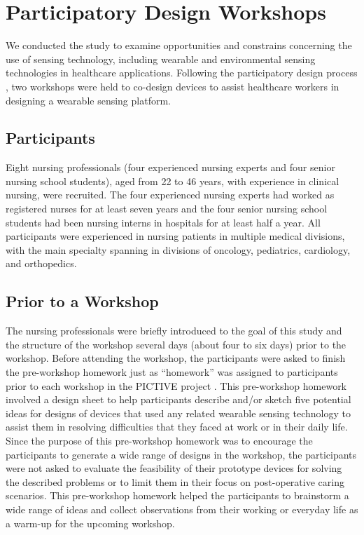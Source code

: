 \section{Participatory Design Workshops}
We conducted the study to examine opportunities and constrains concerning the use of sensing technology, including wearable and environmental sensing technologies in healthcare applications. Following the participatory design process \cite{Greenbaum:1992:DWC:125470, Muller:2002:PDT:772072.772138}, two workshops were held to co-design devices to assist healthcare workers in designing a wearable sensing platform.

\subsection{Participants}
Eight nursing professionals (four experienced nursing experts and four senior nursing school students), aged from 22 to 46 years, with experience in clinical nursing, were recruited. The four experienced nursing experts had worked as registered nurses for at least seven years and the four senior nursing school students had been nursing interns in hospitals for at least half a year. All participants were experienced in nursing patients in multiple medical divisions, with the main specialty spanning in divisions of oncology, pediatrics, cardiology, and orthopedics.

\subsection{Prior to a Workshop}
The nursing professionals were briefly introduced to the goal of this study and the structure of the workshop several days (about four to six days) prior to the workshop. Before attending the workshop, the participants were asked to finish the pre-workshop homework just as “homework” was assigned to participants prior to each workshop in the PICTIVE project \cite{Muller:1991:PEP:108844.108896}. This pre-workshop homework involved a design sheet to help participants describe and/or sketch five potential ideas for designs of devices that used any related wearable sensing technology to assist them in resolving difficulties that they faced at work or in their daily life. Since the purpose of this pre-workshop homework was to encourage the participants to generate a wide range of designs in the workshop, the participants were not asked to evaluate the feasibility of their prototype devices for solving the described problems or to limit them in their focus on post-operative caring scenarios. This pre-workshop homework helped the participants to brainstorm a wide range of ideas and collect observations from their working or everyday life as a warm-up for the upcoming workshop.

